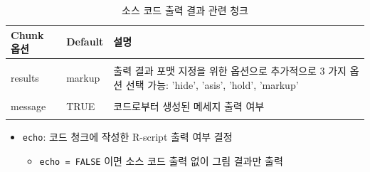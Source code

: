 \documentclass[
  11pt,
]{krantz}
\providecommand{\tightlist}{%
  \setlength{\itemsep}{0pt}\setlength{\parskip}{0pt}}
\begin{document}
\begin{table}[H]

\caption{\label{tab:chunk-tab-02}소스 코드 출력 결과 관련 청크}
\centering
\fontsize{14}{16}\selectfont
\begin{tabular}[t]{>{\raggedright\arraybackslash}p{3cm}>{\raggedright\arraybackslash}p{3cm}>{\raggedright\arraybackslash}p{8cm}}
\toprule
Chunk 옵션 & Default & 설명\\
\midrule
\cellcolor{gray!6}{echo} & \cellcolor{gray!6}{TRUE} & \cellcolor{gray!6}{R 실행 결과에 대응하는 코드 출력 여부}\\
results & markup & 출력 결과 포맷 지정을 위한 옵션으로 추가적으로 3 가지 옵션 선택 가능: 'hide', 'asis', 'hold', 'markup'\\
\cellcolor{gray!6}{error} & \cellcolor{gray!6}{TRUE} & \cellcolor{gray!6}{코드 또는 스크립트에 구문오류 메세지 출력 여부}\\
message & TRUE & 코드로부터 생성된 메세지 출력 여부\\
\cellcolor{gray!6}{warning} & \cellcolor{gray!6}{TRUE} & \cellcolor{gray!6}{경고 메세지 출력 여부}\\
\bottomrule
\end{tabular}
\end{table}

\normalsize

\begin{itemize}
\tightlist
\item
  \texttt{echo}: 코드 청크에 작성한 R-script 출력 여부 결정

  \begin{itemize}
  \tightlist
  \item
    \texttt{echo\ =\ FALSE} 이면 소스 코드 출력 없이 그림 결과만 출력
  \end{itemize}
\end{itemize}
\end{document}
